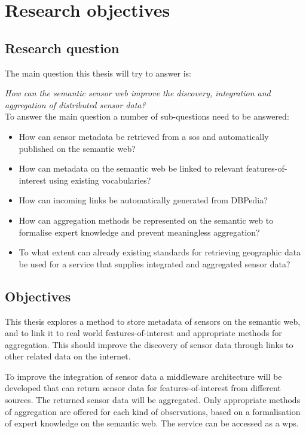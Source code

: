 
\chapter{Research objectives}
\label{chap:objectives}


\section{Research question} 
The main question this thesis will try to answer is: 

\textit{How can the semantic sensor web improve the discovery, integration and aggregation of distributed sensor data?}\\

To answer the main question a number of sub-questions need to be answered:
\begin{itemize}
	\item How can sensor metadata be retrieved from a \ac{sos} and automatically published on the semantic web?
	\item How can metadata on the semantic web be linked to relevant features-of-interest using existing vocabularies?
	\item How can incoming links be automatically generated from DBPedia?
	\item How can aggregation methods be represented on the semantic web to formalise expert knowledge and prevent meaningless aggregation?
	\item To what extent can already existing standards for retrieving geographic data be used for a service that supplies integrated and aggregated sensor data?
\end{itemize}

\section{Objectives}

This thesis explores a method to store metadata of sensors on the semantic web, and to link it to real world features-of-interest and appropriate methods for aggregation. This should improve the discovery of sensor data through links to other related data on the internet.  

To improve the integration of sensor data a middleware architecture will be developed that can return sensor data for features-of-interest from different sources. The returned sensor data will be aggregated. Only appropriate methods of aggregation are offered for each kind of observations, based on a formalisation of expert knowledge on the semantic web. The service can be accessed as a \ac{wps}.

